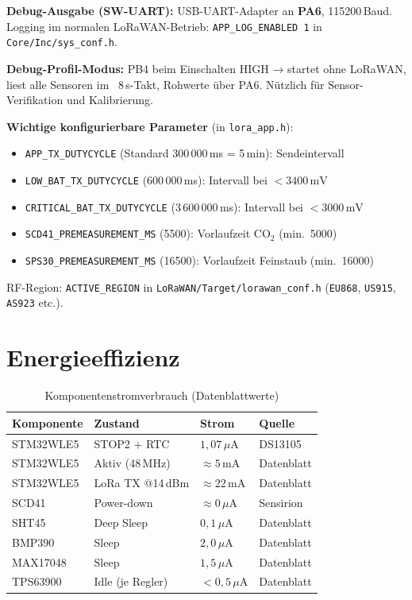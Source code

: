 \documentclass[11pt,a4paper]{scrartcl}
\begin{document}
\textbf{Debug-Ausgabe (SW-UART):} USB-UART-Adapter an \textbf{PA6}, 115200\,Baud.
Logging im normalen LoRaWAN-Betrieb: \texttt{APP\_LOG\_ENABLED~1} in \texttt{Core/Inc/sys\_conf.h}.

\textbf{Debug-Profil-Modus:} PB4 beim Einschalten HIGH → startet ohne LoRaWAN, liest alle Sensoren im ~8\,s-Takt, Rohwerte über PA6. Nützlich für Sensor-Verifikation und Kalibrierung.

\textbf{Wichtige konfigurierbare Parameter} (in \texttt{lora\_app.h}):
\begin{itemize}
  \item \texttt{APP\_TX\_DUTYCYCLE} (Standard 300\,000\,ms = 5\,min): Sendeintervall
  \item \texttt{LOW\_BAT\_TX\_DUTYCYCLE} (600\,000\,ms): Intervall bei $<3400\,\text{mV}$
  \item \texttt{CRITICAL\_BAT\_TX\_DUTYCYCLE} (3\,600\,000\,ms): Intervall bei $<3000\,\text{mV}$
  \item \texttt{SCD41\_PREMEASUREMENT\_MS} (5500): Vorlaufzeit CO$_2$ (min.\ 5000)
  \item \texttt{SPS30\_PREMEASUREMENT\_MS} (16500): Vorlaufzeit Feinstaub (min.\ 16000)
\end{itemize}

RF-Region: \texttt{ACTIVE\_REGION} in \texttt{LoRaWAN/Target/lorawan\_conf.h} (\texttt{EU868}, \texttt{US915}, \texttt{AS923} etc.).

\clearpage
\section{Energieeffizienz}

\begin{table}[H]
  \centering
  \begin{tabular}{llll}
    \hline
    \textbf{Komponente} & \textbf{Zustand} & \textbf{Strom} & \textbf{Quelle} \\
    \hline
    STM32WLE5 & STOP2 + RTC      & $1{,}07\,\mu\text{A}$ & DS13105 \\
    STM32WLE5 & Aktiv (48\,MHz)  & $\approx5\,\text{mA}$ & Datenblatt \\
    STM32WLE5 & LoRa TX @14\,dBm & $\approx22\,\text{mA}$ & Datenblatt \\
    SCD41     & Power-down       & $\approx0\,\mu\text{A}$& Sensirion \\
    SHT45     & Deep Sleep       & $0{,}1\,\mu\text{A}$ & Datenblatt \\
    BMP390    & Sleep            & $2{,}0\,\mu\text{A}$ & Datenblatt \\
    MAX17048  & Sleep            & $1{,}5\,\mu\text{A}$ & Datenblatt \\
    TPS63900  & Idle (je Regler) & $<0{,}5\,\mu\text{A}$ & Datenblatt \\
    \hline
  \end{tabular}
  \caption{Komponentenstromverbrauch (Datenblattwerte)}
\end{table}
\end{document}

